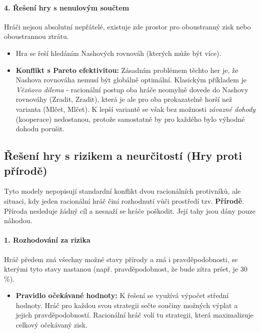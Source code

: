 

\paragraph*{4. Řešení hry s nenulovým součtem}
Hráči nejsou absolutní nepřátelé, existuje zde prostor pro oboustranný zisk nebo oboustrannou ztrátu.
\begin{itemize}
    \item Hra se řeší hledáním Nashových rovnováh (kterých může být více).
    \item \textbf{Konflikt s Pareto efektivitou:} Zásadním problémem těchto her je, že Nashova rovnováha nemusí být globálně optimální. Klasickým příkladem je \textit{Vězňovo dilema} - racionální postup oba hráče neomylně dovede do Nashovy rovnováhy (Zradit, Zradit), která je ale pro oba prokazatelně horší než varianta (Mlčet, Mlčet). K lepší variantě se však bez možnosti \textit{závazné dohody} (kooperace) nedostanou, protože samostatně by pro každého bylo výhodné dohodu porušit.
\end{itemize}



\subsection{Řešení hry s rizikem a neurčitostí (Hry proti přírodě)}
Tyto modely nepopisují standardní konflikt dvou racionálních protivníků, ale situaci, kdy jeden racionální hráč činí rozhodnutí vůči prostředí tzv. \textbf{Přírodě}. Příroda nesleduje žádný cíl a nesnaží se hráče poškodit. Její tahy jsou dány pouze náhodou.

\paragraph*{1. Rozhodování za rizika}
Hráč předem zná všechny možné stavy přírody a zná i pravděpodobnosti, se kterými tyto stavy nastanou (např. pravděpodobnost, že bude zítra pršet, je 30\,\%).
\begin{itemize}
    \item \textbf{Pravidlo očekávané hodnoty:} K řešení se využívá výpočet střední hodnoty. Hráč pro každou svou strategii sečte součiny možných výplat a jejich pravděpodobností. Racionální hráč volí tu strategii, která maximalizuje celkový očekávaný zisk.
\end{itemize}

